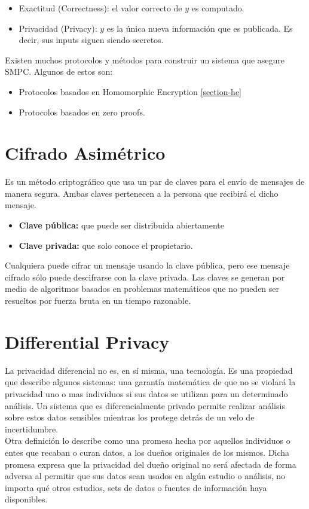 \documentclass[
11pt, %
oneside, %
spanish, %
singlespacing, %
parskip, %
headsepline, %
chapterinoneline, %
]{MastersDoctoralThesis} %
\begin{document}
\begin{itemize}
\item Exactitud (Correctness): el valor correcto de $y$ es computado.
\item Privacidad (Privacy): $y$ es la \'unica nueva informaci\'on que es publicada. Es decir, sus inputs siguen siendo secretos.
\end{itemize}

Existen muchos protocolos y m\'etodos para construir un sistema que asegure SMPC. Algunos de estos son:

\begin{itemize}{}
\item Protocolos basados en Homomorphic Encryption \ref{section-he}
\item Protocolos basados en zero proofs.
\end{itemize}

\section{Cifrado Asimétrico}
Es un método criptográfico que usa un par de claves para el envío de mensajes de manera segura. Ambas claves pertenecen a la persona que recibirá el dicho mensaje.
\begin{itemize}
\item \textbf{Clave pública:} que puede ser distribuida abiertamente
\item \textbf{Clave privada:} que solo conoce el propietario.
\end{itemize}
Cualquiera puede cifrar un mensaje usando la clave pública, pero ese mensaje cifrado sólo puede descifrarse con la clave privada.
Las claves se generan por medio de algoritmos basados en problemas matemáticos que no pueden ser resueltos por fuerza bruta en un tiempo razonable. 

\pagebreak

\section{Differential Privacy}
La privacidad diferencial \cite{diffpriv4} no es, en sí misma, una tecnología. Es una propiedad que describe algunos sistemas: una garantía matemática de que no se violará la privacidad uno o mas individuos si sus datos se utilizan para un determinado análisis. Un sistema que es diferencialmente privado permite realizar análisis sobre estos datos sensibles mientras los protege detrás de un velo de incertidumbre. \\
Otra definición \cite{diffpriv3} lo describe como una promesa hecha por aquellos individuos o entes que recaban o curan datos, a los due\~nos originales de los mismos. Dicha promesa expresa que la privacidad del dueño original no ser\'a afectada de forma adversa al permitir que sus datos sean usados en alg\'un estudio o an\'alisis, no importa qu\'e otros estudios, sets de datos o fuentes de informaci\'on haya disponibles.
\end{document}
